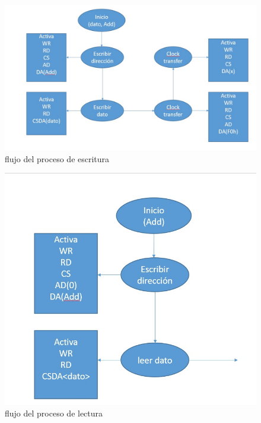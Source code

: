 \documentclass[12pt,a4paper]{report}
\begin{document}
\begin{figure}[hbtp]
	\centering
	\includegraphics[width=16cm]{Img/FlujoEsc.jpg}
	\caption{flujo del proceso de escritura}
	\label{fig:FlujoEsc}
\end{figure}
\begin{figure}[hbtp]
	\centering
	\includegraphics[width=16cm]{Img/Flujolec.jpg}
	\caption{flujo del proceso de lectura}
	\label{fig:Flujolec}
\end{figure}
\end{document}
